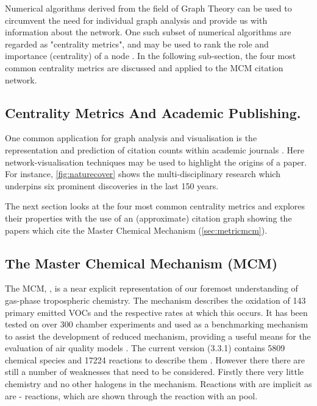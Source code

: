 Numerical algorithms derived from the field of Graph Theory can be used to circumvent the need for individual graph analysis and provide us with information about the network. One such subset of numerical algorithms are regarded as "centrality metrics", and may be used to rank the role and importance (centrality) of a node \citep{squaretower}. In the following sub-section, the four most common centrality metrics are discussed and applied to the MCM citation network.


\subsection{Centrality Metrics And Academic Publishing.}


One common application for graph analysis and visualisation is the representation and prediction of citation counts within academic journals \citep{cocite,google,naturecitation,netcoauthor}. Here network-visualisation techniques may be used to highlight the origins of a paper. For instance, \autoref{fig:naturecover} shows the multi-disciplinary research which underpins six prominent discoveries in the last 150 years.

The next section looks at the four most common centrality metrics and explores their properties with the use of an (approximate) citation graph showing the papers which cite the Master Chemical Mechanism (\autoref{sec:metricmcm}).



\subsection{The Master Chemical Mechanism (MCM)}\label{sec:metricmcm}

The MCM, \citep{mcm}, is a near explicit representation of our foremost understanding of gas-phase tropospheric chemistry. The mechanism describes the oxidation of 143 primary emitted VOCs and the respective rates at which this occurs. It has been tested on over 300 chamber experiments and used as a benchmarking mechanism to assist the development of reduced mechanism, providing a useful means for the evaluation of air quality models \citep{defra1}. The current version (3.3.1) contains 5809 chemical species and 17224 reactions to describe them \citep{isopmcm}. However there there are still a number of weaknesses that need to be considered. Firstly there very little  chemistry and no other halogens in the mechanism. Reactions with  are implicit as are - reactions, which are shown through the reaction with an  pool.





